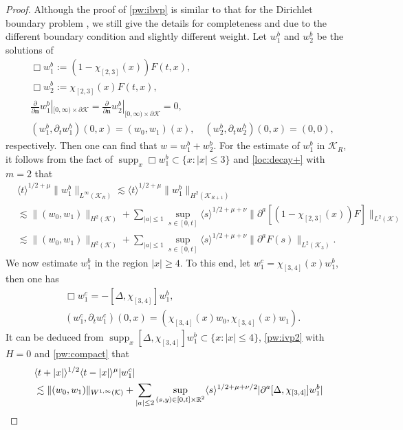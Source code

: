 \documentclass[11pt,twoside]{article}
\def\cK{\mathcal K}
\def\R{\mathop{\mathbb R\kern 0pt}\nolimits}
\def\supp{\mathop{\rm supp}\nolimits}
\def\p{\partial}
\def\supp{\operatorname{supp}}
\def\ls{\lesssim}
\def\bn{\mathbf{n}}
\newcommand{\w}[1]{\langle {#1} \rangle}
\theoremstyle{plain}
\theoremstyle{definition}
\numberwithin{equation}{section}
\begin{document}
\begin{proof}
Although the proof of \eqref{pw:ibvp} is similar to that for the Dirichlet boundary problem \cite{HouYinYuan24},
we still give the details for completeness and due to the different boundary condition and slightly different weight.
Let $w_1^b$ and $w_2^b$ be the solutions of
\begin{equation}\label{pw:ibvp:pf1}
\begin{split}
&\Box w_1^b:=(1-\chi_{[2,3]}(x))F(t,x),\\
&\Box w_2^b:=\chi_{[2,3]}(x)F(t,x),\\
&\frac{\p}{\p\bn}w_1^b|_{[0,\infty)\times\p\cK}=\frac{\p}{\p\bn}w_2^b|_{[0,\infty)\times\p\cK}=0,\\
&(w_1^b,\p_tw_1^b)(0,x)=(w_0,w_1)(x),\quad (w_2^b,\p_tw_2^b)(0,x)=(0,0),
\end{split}
\end{equation}
respectively.
Then one can find that $w=w_1^b+w_2^b$.
For the estimate of $w_1^b$ in $\cK_R$, it follows from the fact of $\supp_x\Box w_1^b\subset\{x:|x|\le3\}$ and \eqref{loc:decay+} with $m=2$ that
\begin{equation}\label{pw:ibvp:pf2}
\begin{split}
&\w{t}^{1/2+\mu}\|w_1^b\|_{L^\infty(\cK_R)}\ls\w{t}^{1/2+\mu}\|w_1^b\|_{H^2(\cK_{R+1})}\\
&\ls\|(w_0,w_1)\|_{H^2(\cK)}+\sum_{|a|\le1}\sup_{s\in[0,t]}\w{s}^{1/2+\mu+\nu}\|\p^a[(1-\chi_{[2,3]}(x))F]\|_{L^2(\cK)}\\
&\ls\|(w_0,w_1)\|_{H^2(\cK)}+\sum_{|a|\le1}\sup_{s\in[0,t]}\w{s}^{1/2+\mu+\nu}\|\p^aF(s)\|_{L^2(\cK_3)}.
\end{split}
\end{equation}
We now estimate $w_1^b$ in the region $|x|\ge4$.
To this end, let $w_1^c=\chi_{[3,4]}(x)w_1^b$, then one has 
\begin{equation*}
\begin{split}
&\Box w_1^c=-[\Delta,\chi_{[3,4]}]w_1^b,\\
&(w_1^c,\p_tw_1^c)(0,x)=(\chi_{[3,4]}(x)w_0,\chi_{[3,4]}(x)w_1).
\end{split}
\end{equation*}
It can be deduced from $\supp_x[\Delta,\chi_{[3,4]}]w_1^b\subset\{x:|x|\le4\}$, \eqref{pw:ivp2} with $H=0$ and \eqref{pw:compact} that
\begin{equation}\label{pw:ibvp:pf3}
\begin{split}
&\w{t+|x|}^{1/2}\w{t-|x|}^{\mu}|w_1^c|\\
&\ls\|(w_0,w_1)\|_{W^{1,\infty}(\cK)}+\sum_{|a|\le2}\sup_{(s,y)\in[0,t]\times\R^2}\w{s}^{1/2+\mu+\nu/2}|\p^a[\Delta,\chi_{[3,4]}]w_1^b|\\

\end{split}
\end{equation}
\end{proof}
\end{document}
